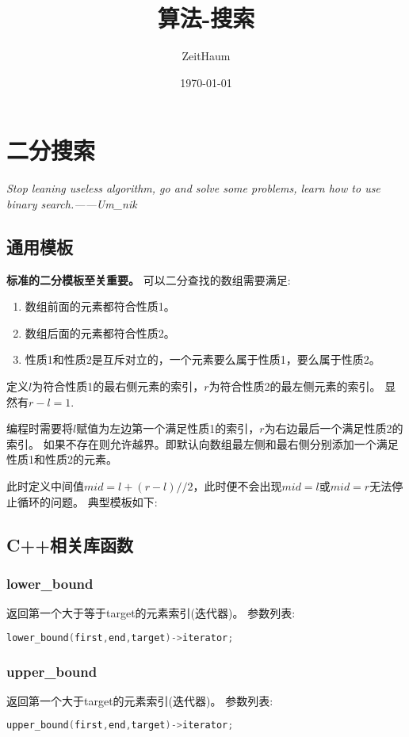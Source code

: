 \documentclass{article}
\author{ZeitHaum}
\date{\today}
\title{算法-搜索}
\begin{document}
    \maketitle
    \newpage 
    \tableofcontents
    \newpage
    \setcounter{page}{1}
    \section{二分搜索}
    \emph{Stop leaning useless algorithm, go and solve some problems, learn how to use binary search.——Um\_nik}
    \subsection{通用模板}
    \textbf{标准的二分模板至关重要。}
    可以二分查找的数组需要满足:
    \begin{enumerate}
        \item 数组前面的元素都符合性质1。
        \item 数组后面的元素都符合性质2。
        \item 性质1和性质2是互斥对立的，一个元素要么属于性质1，要么属于性质2。
    \end{enumerate}

    定义$l$为符合性质1的最右侧元素的索引，$r$为符合性质2的最左侧元素的索引。
    显然有$r - l = 1.$

    编程时需要将$l$赋值为左边第一个满足性质1的索引，$r$为右边最后一个满足性质2的索引。
    如果不存在则允许越界。即默认向数组最左侧和最右侧分别添加一个满足性质1和性质2的元素。

    此时定义中间值$mid = l + (r - l)//2$，此时便不会出现$mid = l$或$mid = r$无法停止循环的问题。
    典型模板如下:

    

    \subsection{C++相关库函数}
    \subsubsection{lower\_bound}
    返回第一个大于等于target的元素索引(迭代器)。
    参数列表:
    \begin{lstlisting}[language=c++]
        lower_bound(first,end,target)->iterator;
    \end{lstlisting}
    
    \subsubsection{upper\_bound}
    返回第一个大于target的元素索引(迭代器)。
    参数列表:
    \begin{lstlisting}[language=c++]
        upper_bound(first,end,target)->iterator;
    \end{lstlisting}
\end{document}
